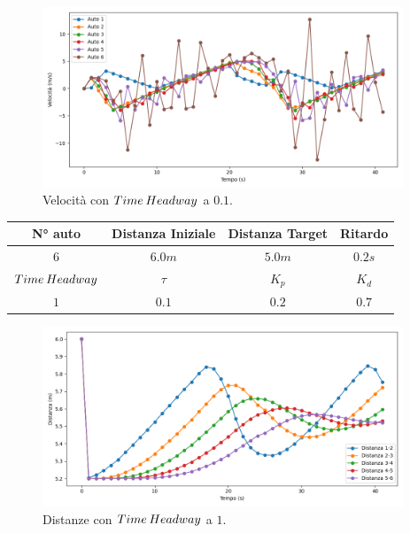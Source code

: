 \begin{figure}[H]
    \includegraphics[width=0.96\textwidth]{images/5-experiment/time-headway/velocity_0,1.png}
    \caption{Velocità con $Time\hspace{0.2em}Headway$ a $0.1$.}
    \label{fig:0.1-headway-velocity}
\end{figure}
\vspace*{\fill}
\newpage
\vspace*{\fill}
\begin{table}[h]
    \centering
    \begin{tabular}{|c|c|c|c|}
        \hline
        N° auto & Distanza Iniziale & Distanza Target & Ritardo \\
        \hline
        $6$ & $6.0 m$ & $5.0 m$ & $0.2 s$ \\
        \hline
        $Time\hspace{0.2em}Headway$ & $\tau$ & $K_p$ & $K_d$  \\
        \hline
        $1$ & $0.1$ & $0.2$ & $0.7$ \\
        \hline
    \end{tabular}
\end{table}

\begin{figure}[H]
    \includegraphics[width=0.96\textwidth]{images/5-experiment/time-headway/distance_1.png}
    \caption{Distanze con $Time\hspace{0.2em}Headway$ a $1$.}
    \label{fig:1-headway-distance}
\end{figure}

